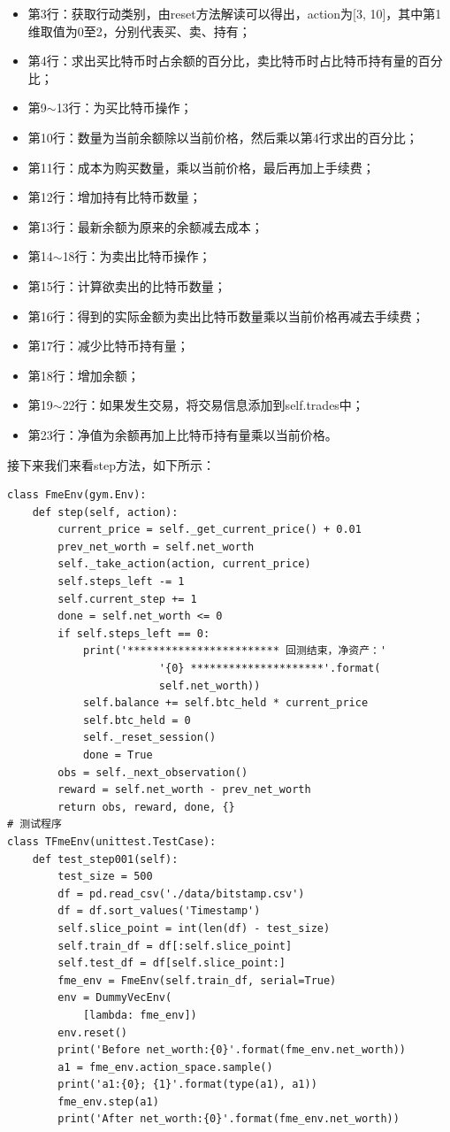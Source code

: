 \documentclass{article}
\begin{document}
\begin{itemize}
\item 第3行：获取行动类别，由reset方法解读可以得出，action为[3, 10]，其中第1维取值为0至2，分别代表买、卖、持有；
\item 第4行：求出买比特币时占余额的百分比，卖比特币时占比特币持有量的百分比；
\item 第9$\sim$13行：为买比特币操作；
\item 第10行：数量为当前余额除以当前价格，然后乘以第4行求出的百分比；
\item 第11行：成本为购买数量，乘以当前价格，最后再加上手续费；
\item 第12行：增加持有比特币数量；
\item 第13行：最新余额为原来的余额减去成本；
\item 第14$\sim$18行：为卖出比特币操作；
\item 第15行：计算欲卖出的比特币数量；
\item 第16行：得到的实际金额为卖出比特币数量乘以当前价格再减去手续费；
\item 第17行：减少比特币持有量；
\item 第18行：增加余额；
\item 第19$\sim$22行：如果发生交易，将交易信息添加到self.trades中；
\item 第23行：净值为余额再加上比特币持有量乘以当前价格。
\end{itemize}
接下来我们来看step方法，如下所示：
\begin{lstlisting}
class FmeEnv(gym.Env):
    def step(self, action):
        current_price = self._get_current_price() + 0.01
        prev_net_worth = self.net_worth
        self._take_action(action, current_price)
        self.steps_left -= 1
        self.current_step += 1
        done = self.net_worth <= 0
        if self.steps_left == 0:
            print('************************ 回测结束，净资产：'
                        '{0} *********************'.format(
                        self.net_worth))
            self.balance += self.btc_held * current_price
            self.btc_held = 0
            self._reset_session()
            done = True
        obs = self._next_observation()
        reward = self.net_worth - prev_net_worth
        return obs, reward, done, {}
# 测试程序
class TFmeEnv(unittest.TestCase):
    def test_step001(self):
        test_size = 500
        df = pd.read_csv('./data/bitstamp.csv')
        df = df.sort_values('Timestamp')
        self.slice_point = int(len(df) - test_size)
        self.train_df = df[:self.slice_point]
        self.test_df = df[self.slice_point:]
        fme_env = FmeEnv(self.train_df, serial=True)
        env = DummyVecEnv(
            [lambda: fme_env])
        env.reset()
        print('Before net_worth:{0}'.format(fme_env.net_worth))
        a1 = fme_env.action_space.sample()
        print('a1:{0}; {1}'.format(type(a1), a1))
        fme_env.step(a1)
        print('After net_worth:{0}'.format(fme_env.net_worth))
\end{lstlisting}
\end{document}
